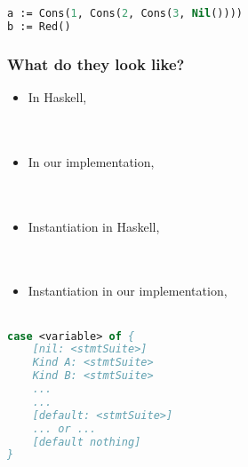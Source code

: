 \documentclass{beamer}
\begin{document}
\begin{lrbox}{\pZeroTypesInst}
\begin{lstlisting}[language=Pascal, basicstyle=\footnotesize]
a := Cons(1, Cons(2, Cons(3, Nil())))
b := Red()
\end{lstlisting}
\end{lrbox}

\begin{frame}
\frametitle{What do they look like?}
\begin{itemize}
 \item<1-> In Haskell,\\
    \usebox{\haskellTypes} \\
    \ \\
 \item<2-> In our implementation,\\
    \usebox{\pZeroTypes} \\
    \ \\
 \item<3-> Instantiation in Haskell,\\
    \usebox{\haskellTypesInst} \\
    \ \\
 \item<4-> Instantiation in our implementation,\\
    \usebox{\pZeroTypesInst} \\
\end{itemize}

\end{frame}

\begin{lrbox}{\anatomyOfCaseBox}
\begin{lstlisting}[language=Pascal, basicstyle=\footnotesize]
case <variable> of {
    [nil: <stmtSuite>]
    Kind A: <stmtSuite>
    Kind B: <stmtSuite>
    ...
    ...
    [default: <stmtSuite>]
    ... or ...
    [default nothing]
}
\end{lstlisting}
\end{lrbox}
\end{document}

